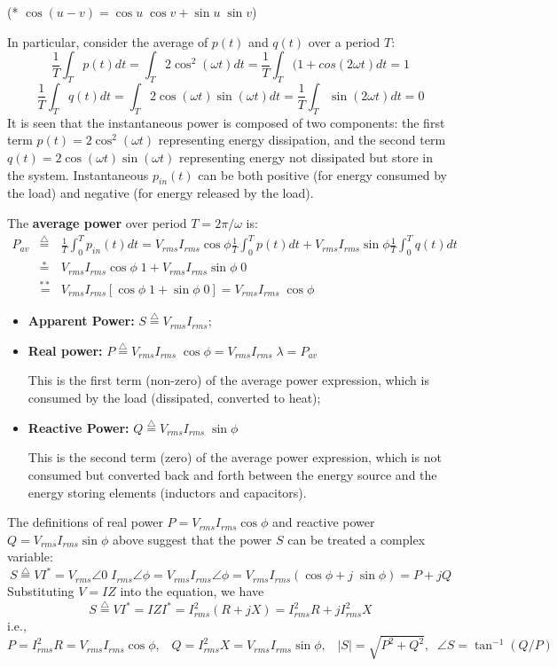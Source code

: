 (* $\cos(u-v)=\cos u\;\cos v+\sin u\;\sin v$)


In particular, consider the average of $p(t)$ and $q(t)$ over a period $T$:
\[ \frac{1}{T}\int_T p(t)dt=\int_T 2\cos^2(\omega t) dt
	=\frac{1}{T}\int_T (1+cos(2\omega t) dt=1	\]
\[ \frac{1}{T}\int_T q(t)dt=\int_T 2\cos(\omega t)\sin(\omega t) dt
	=\frac{1}{T}\int_T \sin(2\omega t) dt=0	\]
It is seen that the instantaneous power is composed of two components: the 
first term $p(t)=2\cos^2(\omega t)$ representing energy dissipation, and the 
second term $q(t)=2\cos(\omega t)\sin(\omega t)$ representing energy not dissipated
but store in the system. Instantaneous $p_{in}(t)$ can be both positive (for energy 
consumed by the load) and negative (for energy released by the load).


The {\bf average power} over period $T=2\pi /\omega$ is:
\begin{eqnarray}
P_{av}&\stackrel{\triangle}{=}&\frac{1}{T}\int_0^T p_{in}(t) dt
=V_{rms}I_{rms}\cos\phi \frac{1}{T}\int_0^T p(t) dt
+V_{rms}I_{rms}\sin\phi \frac{1}{T}\int_0^T q(t) dt	\nonumber \\
&\stackrel{*}{=}&
V_{rms}I_{rms}\cos\phi \; 1+V_{rms}I_{rms}\sin\phi \;0
	\nonumber \\
&\stackrel{**}{=}&V_{rms}I_{rms}[\cos\phi\;1 +\sin\phi\; 0]
	=V_{rms}I_{rms}\;\cos\phi
	\nonumber 
\end{eqnarray}

\begin{itemize}
\item {\bf Apparent Power:} $S\stackrel{\triangle}{=}V_{rms}I_{rms}$;
\item {\bf Real power:} $P\stackrel{\triangle}{=}V_{rms}I_{rms}\;\cos\phi
	=V_{rms}I_{rms}\;\lambda=P_{av}$

	This is the first term (non-zero) of the average power expression, 
	which is consumed by the load (dissipated, converted to heat);
\item {\bf  Reactive Power:} $Q\stackrel{\triangle}{=}V_{rms}I_{rms}\;\sin\phi$

	This is the second term (zero) of the average power expression,	
	which is not consumed but converted back and forth between the
	energy source and the energy storing elements (inductors and capacitors).
\end{itemize}
The definitions of real power $P=V_{rms}I_{rms} \cos\phi$ and reactive 
power $Q=V_{rms}I_{rms} \sin\phi$ above suggest that the power $S$ can 
be treated a complex variable:
\[ S\stackrel{\triangle}{=}VI^*=V_{rms}\angle 0\; I_{rms}\angle \phi
	=V_{rms}I_{rms}\angle \phi=V_{rms}I_{rms}(\cos\phi+j\;\sin\phi)
	=P+jQ	\]
Substituting $V=IZ$ into the equation, we have
\[ S\stackrel{\triangle}{=}VI^*=IZI^*=I^2_{rms}(R+jX)
	=I^2_{rms}R+j I^2_{rms}X	\]
i.e.,
\[	P=I^2_{rms}R=V_{rms}I_{rms}\cos\phi,\;\;\;
	Q=I^2_{rms}X=V_{rms}I_{rms}\sin\phi,\;\;\;
	|S|=\sqrt{P^2+Q^2},\;\;\angle S=\tan^{-1}(Q/P)	\]

